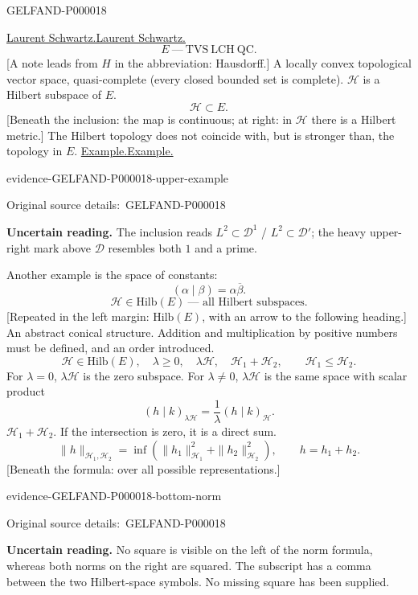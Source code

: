 \documentclass[11pt]{article}
\let\MathUnderline\underline
\renewcommand{\underline}[1]{\ifmmode\MathUnderline{#1}\else\uline{#1}\fi}
\newcommand{\SourcePage}[2]{\par\smallskip\phantomsection\label{#1:source-page}{\small\sffamily\color{blue!55!black}#1}\par\smallskip}
\newcommand{\EvidenceBlock}[4]{%
 \par\smallskip\noindent\begin{minipage}{\linewidth}
 \begin{minipage}[t]{.47\linewidth}\vspace{0pt}\centering
 \csname evidence-#1-#2\endcsname\par
 {\scriptsize\SourceCropCaption\ #1}\par
 \end{minipage}\hfill
 \begin{minipage}[t]{.49\linewidth}\vspace{0pt}\raggedright
 {\small\color{orange!65!black}\textbf{#4} #3}\par
 \end{minipage}
 \end{minipage}\par\smallskip}
\newcommand{\Unclear}[3]{\EvidenceBlock{#1}{#2}{#3}{\ReadingCaption}}
\newcommand{\SourceCropCaption}{Original source details:}\newcommand{\ReadingCaption}{Uncertain reading.}\newcommand{\IncompleteCaption}{Undeciphered passage.}\newcommand{\DiagramCaption}{Diagram and typed description.}
\begin{document}
\SourcePage{GELFAND-P000018}{unlabelled}
\underline{Laurent Schwartz.}
\begin{equation*}
E\ \text{---}\ \mathrm{TVS\ LCH\ QC}.
\end{equation*}
[A note leads from $H$ in the abbreviation: Hausdorff.]
A locally convex topological vector space, quasi-complete (every closed bounded set is complete).
$\mathcal H$ is a Hilbert subspace of $E$.
\begin{equation*}
\mathcal H\subset E.
\end{equation*}
[Beneath the inclusion: the map is continuous; at right: in $\mathcal H$ there is a Hilbert metric.]
The Hilbert topology does not coincide with, but is stronger than, the topology in $E$.
\underline{Example.}
\Unclear{GELFAND-P000018}{upper-example}{The inclusion reads $L^2\subset\mathcal D^1$ / $L^2\subset\mathcal D'$; the heavy upper-right mark above $\mathcal D$ resembles both $1$ and a prime.}
Another example is the space of constants:
\begin{equation*}
(\alpha\mid\beta)=\alpha\overline\beta.
\end{equation*}
\begin{equation*}
\mathcal H\in\mathrm{Hilb}(E)\ \text{--- all Hilbert subspaces}.
\end{equation*}
[Repeated in the left margin: $\mathrm{Hilb}(E)$, with an arrow to the following heading.]
An abstract conical structure.
Addition and multiplication by positive numbers must be defined, and an order introduced.
\begin{equation*}
\mathcal H\in\mathrm{Hilb}(E),\quad \lambda\geq0,\quad \lambda\mathcal H,\quad
\mathcal H_1+\mathcal H_2,\qquad \mathcal H_1\leq\mathcal H_2.
\end{equation*}
For $\lambda=0$, $\lambda\mathcal H$ is the zero subspace.
For $\lambda\ne0$, $\lambda\mathcal H$ is the same space with scalar product
\begin{equation*}
(h\mid k)_{\lambda\mathcal H}=\frac1\lambda(h\mid k)_{\mathcal H}.
\end{equation*}
$\mathcal H_1+\mathcal H_2$.
If the intersection is zero, it is a direct sum.
\begin{equation*}
\|h\|_{\mathcal H_1,\mathcal H_2}
=\inf\left(\|h_1\|_{\mathcal H_1}^2+\|h_2\|_{\mathcal H_2}^2\right),\qquad h=h_1+h_2.
\end{equation*}
[Beneath the formula: over all possible representations.]
\Unclear{GELFAND-P000018}{bottom-norm}{No square is visible on the left of the norm formula, whereas both norms on the right are squared. The subscript has a comma between the two Hilbert-space symbols. No missing square has been supplied.}
\end{document}
